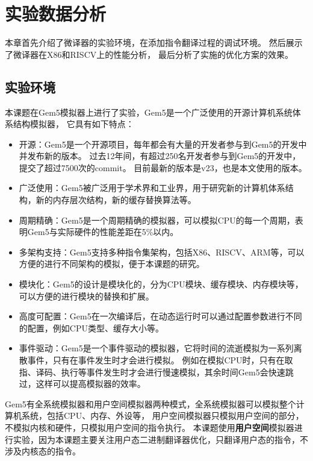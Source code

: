 \chapter{实验数据分析}\label{chap:Epxeriment}

本章首先介绍了微译器的实验环境，在添加指令翻译过程的调试环境。
然后展示了微译器在X86和RISCV上的性能分析，
最后分析了实施的优化方案的效果。

\section{实验环境}

本课题在Gem5模拟器\cite{gem5OriginalPaper}上进行了实验，Gem5是一个广泛使用的开源计算机系统体系结构模拟器，
它具有如下特点：
\begin{itemize}
  \item 开源：Gem5是一个开源项目，每年都会有大量的开发者参与到Gem5的开发中并发布新的版本。
  过去12年间，有超过250名开发者参与到Gem5的开发中，提交了超过7500次的commit\cite{Gem5SimulatorVersion2020}。
  目前最新的版本是v23，也是本文使用的版本。
  \item 广泛使用：Gem5被广泛用于学术界和工业界，用于研究新的计算机体系结构，新的内存层次结构，新的缓存替换算法等。
  \item 周期精确：Gem5是一个周期精确的模拟器，可以模拟CPU的每一个周期，\cite{Butko2012AccuracyEO}表明Gem5与实际硬件的性能差距在5\%以内。
  \item 多架构支持：Gem5支持多种指令集架构，包括X86、RISCV、ARM等，可以方便的进行不同架构的模拟，便于本课题的研究。
  \item 模块化：Gem5的设计是模块化的，分为CPU模块、缓存模块、内存模块等，可以方便的进行模块的替换和扩展。
  \item 高度可配置：Gem5在一次编译后，在动态运行时可以通过配置参数进行不同的配置，例如CPU类型、缓存大小等。
  \item 事件驱动：Gem5是一个事件驱动的模拟器，它将时间的流逝模拟为一系列离散事件，只有在事件发生时才会进行模拟。
  例如在模拟CPU时，只有在取指、译码、执行等事件发生时才会进行慢速模拟，其余时间Gem5会快速跳过，这样可以提高模拟器的效率。
\end{itemize}

Gem5有全系统模拟器和用户空间模拟器两种模式，全系统模拟器可以模拟整个计算机系统，包括CPU、内存、外设等，
用户空间模拟器只模拟用户空间的部分，不模拟内核和硬件，只模拟用户空间的指令执行\cite{gem5OriginalPaper}。
本课题使用\textbf{用户空间}模拟器进行实验，因为本课题主要关注用户态二进制翻译器优化，只翻译用户态的指令，不涉及内核态的指令。

